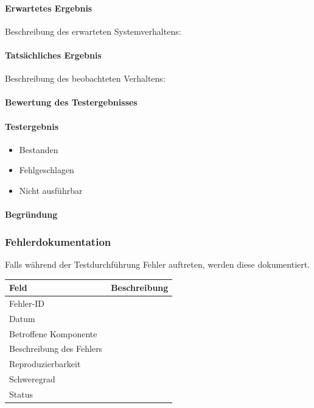 \documentclass[
  a4paper,
  12pt,
  DIV=12,        %
  parskip=half,  %
  headings=small %
]{scrartcl}
\theoremstyle{definition}
\theoremstyle{definition}
\begin{document}
\paragraph{Erwartetes Ergebnis}\label{erwartetes-ergebnis-34}

Beschreibung des erwarteten Systemverhaltens:

\paragraph{Tatsächliches Ergebnis}\label{tatsuxe4chliches-ergebnis}

Beschreibung des beobachteten Verhaltens:

\paragraph{Bewertung des
Testergebnisses}\label{bewertung-des-testergebnisses}

\paragraph{Testergebnis}\label{testergebnis}
\begin{itemize}
  \item Bestanden
  \item Fehlgeschlagen
  \item Nicht ausführbar
\end{itemize}

\paragraph{Begründung}\label{begruxfcndung}

\subsubsection{Fehlerdokumentation}\label{fehlerdokumentation}

Falls während der Testdurchführung Fehler auftreten, werden diese
dokumentiert.

\begin{longtable}[]{@{}ll@{}}
\toprule\noalign{}
Feld & Beschreibung \\
\midrule\noalign{}
\endhead
\bottomrule\noalign{}
\endlastfoot
Fehler-ID & \\
Datum & \\
Betroffene Komponente & \\
Beschreibung des Fehlers & \\
Reproduzierbarkeit & \\
Schweregrad & \\
Status & \\
\end{longtable}
\end{document}
